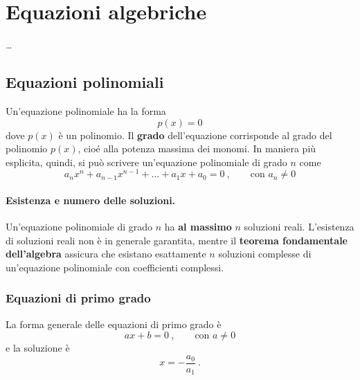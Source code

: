 \section{Equazioni algebriche}
\begin{definition} \dots
\end{definition}

\subsection{Equazioni polinomiali}
\begin{definition} Un'equazione polinomiale ha la forma
    \begin{equation} p(x) = 0 \end{equation}
dove $p(x)$ è un polinomio.
Il \textbf{grado} dell'equazione corrisponde al grado del polinomio $p(x)$, cioé alla potenza massima dei monomi. In maniera più esplicita, quindi, si può scrivere un'equazione polinomiale di grado $n$ come
    \begin{equation}
        a_n x^n + a_{n-1} x^{n-1} + \dots + a_1 x + a_0 = 0 \ , \qquad \text{con $a_n \ne 0$}
    \end{equation}
\end{definition}

\paragraph{Esistenza e numero delle soluzioni.} Un'equazione polinomiale di grado $n$ ha \textbf{al massimo} $n$ soluzioni reali. L'esistenza di soluzioni reali non è in generale garantita, mentre il \textbf{teorema fondamentale dell'algebra} assicura che esistano esattamente $n$ soluzioni complesse di un'equazione polinomiale con coefficienti complessi.

\subsubsection{Equazioni di primo grado}
La forma generale delle equazioni di primo grado è
\begin{equation}
    a x + b = 0 \ , \qquad \text{con $a \ne 0$}
\end{equation}
e la soluzione è
\begin{equation}
  x = -\dfrac{a_0}{a_1} \ .
\end{equation}
